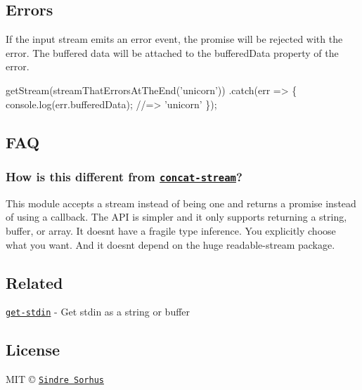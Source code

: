 \subsection*{Errors}

If the input stream emits an {\ttfamily error} event, the promise will be rejected with the error. The buffered data will be attached to the {\ttfamily buffered\+Data} property of the error.


\begin{DoxyCode}
getStream(streamThatErrorsAtTheEnd('unicorn'))
  .catch(err => \{
    console.log(err.bufferedData);
    //=> 'unicorn'
  \});
\end{DoxyCode}


\subsection*{F\+AQ}

\subsubsection*{How is this different from \href{https://github.com/maxogden/concat-stream}{\tt {\ttfamily concat-\/stream}}?}

This module accepts a stream instead of being one and returns a promise instead of using a callback. The A\+PI is simpler and it only supports returning a string, buffer, or array. It doesn\textquotesingle{}t have a fragile type inference. You explicitly choose what you want. And it doesn\textquotesingle{}t depend on the huge {\ttfamily readable-\/stream} package.

\subsection*{Related}


\begin{DoxyItemize}
\item \href{https://github.com/sindresorhus/get-stdin}{\tt get-\/stdin} -\/ Get stdin as a string or buffer
\end{DoxyItemize}

\subsection*{License}

M\+IT © \href{https://sindresorhus.com}{\tt Sindre Sorhus} 